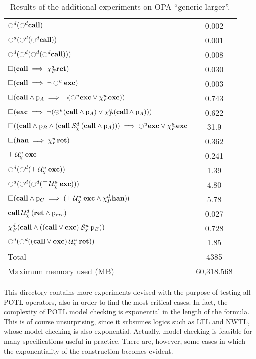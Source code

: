 \documentclass{article}
\begin{document}
\begin{table}
\begin{tabular}{| l | c |}
$\ocircle^d (\ocircle^d \mathbf{call})$ & 0.002 \\
$\ocircle^d (\ocircle^d (\ocircle^d \mathbf{call}))$ & 0.001 \\
$\ocircle^d (\ocircle^d (\ocircle^d (\ocircle^d \mathbf{call})))$ & 0.008 \\
$\square (\mathbf{call} \implies \chi_F^{d} \mathbf{ret})$ & 0.030 \\
$\square (\mathbf{call} \implies \neg \ocircle^u \mathbf{exc})$ & 0.003 \\
$\square (\mathbf{call} \land \mathrm{p}_A \implies \neg (\ocircle^u \mathbf{exc} \lor \chi_F^{u} \mathbf{exc}))$ & 0.743 \\
$\square (\mathbf{exc} \implies \neg (\circleddash^u (\mathbf{call} \land \mathrm{p}_A) \lor \chi_P^{u} (\mathbf{call} \land \mathrm{p}_A)))$ & 0.622 \\
$\square ((\mathbf{call} \land \mathrm{p}_B \land ({\mathbf{call}} \mathbin{\mathcal{S}_\chi^d} {(\mathbf{call} \land \mathrm{p}_A)})) \implies \ocircle^u \mathbf{exc} \lor \chi_F^{u} \mathbf{exc}$ & 31.9 \\
$\square (\mathbf{han} \implies \chi_F^{u} \mathbf{ret})$ & 0.362 \\
${\top} \mathbin{\mathcal{U}_\chi^u} {\mathbf{exc}}$ & 0.241 \\
$\ocircle^d (\ocircle^d ({\top} \mathbin{\mathcal{U}_\chi^u} {\mathbf{exc}}))$ & 1.39 \\
$\ocircle^d (\ocircle^d (\ocircle^d ({\top} \mathbin{\mathcal{U}_\chi^u} {\mathbf{exc}})))$ & 4.80 \\
$\square (\mathbf{call} \land \mathrm{p}_C \implies ({\top} \mathbin{\mathcal{U}_\chi^u} {\mathbf{exc} \land \chi_P^{d} \mathbf{han}}))$ & 5.78 \\
${\mathbf{call}} \mathbin{\mathcal{U}_\chi^d} {(\mathbf{ret} \land \mathrm{p}_\mathit{err})}$ & 0.027 \\
$\chi_F^{d} (\mathbf{call} \land ({(\mathbf{call} \lor \mathbf{exc})} \mathbin{\mathcal{S}_\chi^u} {\mathrm{p}_B}))$ & 0.728 \\
$\ocircle^d (\ocircle^d ({(\mathbf{call} \lor \mathbf{exc})} \mathbin{\mathcal{U}_\chi^u} {\mathbf{ret}}))$ & 1.85 \\
\hline
Total & 4385 \\
\hline
\hline
Maximum memory used (MB) & 60,318.568 \\
\hline
\end{tabular}
\caption{Results of the additional experiments on OPA ``generic larger''.}
\label{tab:more-exp-3}
\end{table}

This directory contains more experiments devised with the purpose of
testing all POTL operators, also in order to find the most critical
cases.  In fact, the complexity of POTL model checking is exponential
in the length of the formula.  This is of course unsurprising, since
it subsumes logics such as LTL and NWTL, whose model checking is also
exponential.  Actually, model checking is feasible for many
specifications useful in practice.  There are, however, some cases in
which the exponentiality of the construction becomes evident.
\end{document}
